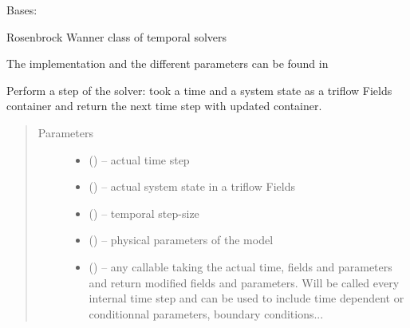 \documentclass[letterpaper,10pt,english]{sphinxmanual}
\begin{document}

\begin{fulllineitems}
\label{\detokenize{triflow.plugins:triflow.plugins.schemes.ROW_general}}
Bases: 

Rosenbrock Wanner class of temporal solvers

The implementation and the different parameters can be found in

\begin{fulllineitems}
\label{\detokenize{triflow.plugins:triflow.plugins.schemes.ROW_general.__call__}}
Perform a step of the solver: took a time and a system state as a
triflow Fields container and return the next time step with updated
container.
\begin{quote}\begin{description}
\item[{Parameters}] \leavevmode\begin{itemize}
\item {} 
 () -- actual time step

\item {} 
 () -- actual system state in a triflow Fields

\item {} 
 () -- temporal step-size

\item {} 
 () -- physical parameters of the model

\item {} 
 (\sphinxstyleliteralemphasis{, }) -- any callable taking the actual time, fields and parameters and return modified fields and parameters. Will be called every internal time step and can be used to include time dependent or conditionnal parameters, boundary conditions...


\end{itemize}
\end{description}
\end{quote}
\end{fulllineitems}
\end{fulllineitems}
\end{document}

